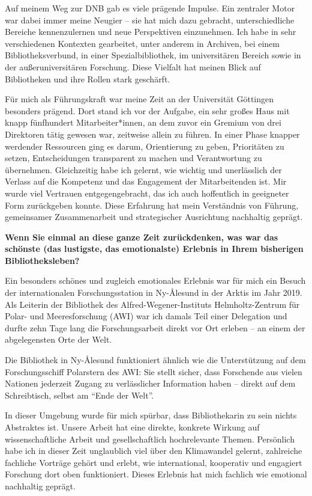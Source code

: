 \documentclass[a4paper,
fontsize=11pt,
oneside,
numbers=noperiodatend,
parskip=half-,
bibliography=totoc,
final
]{scrartcl}
\begin{document}
Auf meinem Weg zur DNB gab es viele prägende Impulse. Ein zentraler
Motor war dabei immer meine Neugier -- sie hat mich dazu gebracht,
unterschiedliche Bereiche kennenzulernen und neue Perspektiven
einzunehmen. Ich habe in sehr verschiedenen Kontexten gearbeitet, unter
anderem in Archiven, bei einem Bibliotheksverbund, in einer
Spezialbibliothek, im universitären Bereich sowie in der
außeruniversitären Forschung. Diese Vielfalt hat meinen Blick auf
Bibliotheken und ihre Rollen stark geschärft.

Für mich als Führungskraft war meine Zeit an der Universität Göttingen
besonders prägend. Dort stand ich vor der Aufgabe, ein sehr großes Haus
mit knapp fünfhundert Mitarbeiter*innen, an dem zuvor ein Gremium von
drei Direktoren tätig gewesen war, zeitweise allein zu führen. In einer
Phase knapper werdender Ressourcen ging es darum, Orientierung zu geben,
Prioritäten zu setzen, Entscheidungen transparent zu machen und
Verantwortung zu übernehmen. Gleichzeitig habe ich gelernt, wie wichtig
und unerlässlich der Verlass auf die Kompetenz und das Engagement der
Mitarbeitenden ist. Mir wurde viel Vertrauen entgegengebracht, das ich
auch hoffentlich in geeigneter Form zurückgeben konnte. Diese Erfahrung
hat mein Verständnis von Führung, gemeinsamer Zusammenarbeit und
strategischer Ausrichtung nachhaltig geprägt.

\textbf{Wenn Sie einmal an diese ganze Zeit zurückdenken, was war das
schönste (das lustigste, das emotionalste) Erlebnis in Ihrem bisherigen
Bibliotheksleben?~}

Ein besonders schönes und zugleich emotionales Erlebnis war für mich ein
Besuch der internationalen Forschungsstation in Ny-Ålesund in der Arktis
im Jahr 2019. Als Leiterin der Bibliothek des Alfred-Wegener-Instituts
Helmholtz-Zentrum für Polar- und Meeresforschung (AWI) war ich damals
Teil einer Delegation und durfte zehn Tage lang die Forschungsarbeit
direkt vor Ort erleben -- an einem der abgelegensten Orte der Welt.

Die Bibliothek in Ny-Ålesund funktioniert ähnlich wie die Unterstützung
auf dem Forschungsschiff Polarstern des AWI: Sie stellt sicher, dass
Forschende aus vielen Nationen jederzeit Zugang zu verlässlicher
Information haben -- direkt auf dem Schreibtisch, selbst am
\enquote{Ende der Welt}.

In dieser Umgebung wurde für mich spürbar, dass Bibliothekarin zu sein
nichts Abstraktes ist. Unsere Arbeit hat eine direkte, konkrete Wirkung
auf wissenschaftliche Arbeit und gesellschaftlich hochrelevante Themen.
Persönlich habe ich in dieser Zeit unglaublich viel über den Klimawandel
gelernt, zahlreiche fachliche Vorträge gehört und erlebt, wie
international, kooperativ und engagiert Forschung dort oben
funktioniert. Dieses Erlebnis hat mich fachlich wie emotional nachhaltig
geprägt.
\end{document}
